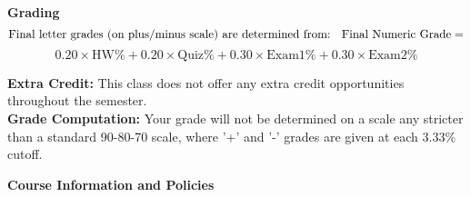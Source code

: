 \documentclass[11pt]{article}
\begin{document}
\vspace*{.3cm}
%


\noindent\textbf{{\large Grading}}
\vspace*{-.1cm}
\[\mbox{Final letter grades (on plus/minus scale) are determined from:\,\,\, Final Numeric Grade} = \]
\[0.20\times\mbox{HW\%} + 0.20\times\mbox{Quiz\%} + 0.30\times\mbox{Exam1\%} + 0.30\times\mbox{Exam2\%}\]

\vspace*{.3cm}

\textbf{{\large Extra Credit:}} This class does not offer any extra credit opportunities throughout the semester. \\

\textbf{{\large Grade Computation:}} Your grade will not be determined on a scale any stricter than a standard 90-80-70 scale, where '+' and '-' grades are given at each 3.33\% cutoff. \\


\vspace*{.5cm}

\noindent\textbf{{\large Course Information and Policies}}
\end{document}
